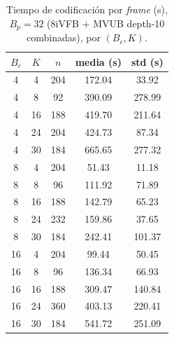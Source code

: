         \begin{table}[H]
            \centering
            \caption{Tiempo de codificación por \textit{frame} (s), $B_p=32$ (8iVFB + MVUB
            depth-10 combinadas), por $(B_c, K)$.}
            \begin{tabular}{c|c|c|c|c}
                \hline
                $B_c$ & $K$ & $n$ & \textbf{media (s)} & \textbf{std (s)} \\
                \hline
                4  &  4 & 204 &  172.04 &  33.92 \\
                4  &  8 &  92 &  390.09 & 278.99 \\
                4  & 16 & 188 &  419.70 & 211.64 \\
                4  & 24 & 204 &  424.73 &  87.34 \\
                4  & 30 & 184 &  665.65 & 277.32 \\
                \hline
                8  &  4 & 204 &   51.43 &  11.18 \\
                8  &  8 &  96 &  111.92 &  71.89 \\
                8  & 16 & 188 &  142.79 &  65.23 \\
                8  & 24 & 232 &  159.86 &  37.65 \\
                8  & 30 & 184 &  242.41 & 101.37 \\
                \hline
                16 &  4 & 204 &   99.44 &  50.45 \\
                16 &  8 &  96 &  136.34 &  66.93 \\
                16 & 16 & 188 &  309.47 & 140.84 \\
                16 & 24 & 360 &  403.13 & 220.41 \\
                16 & 30 & 184 &  541.72 & 251.09 \\
                \hline
            \end{tabular}
            \label{tab:e10_cost_bp32}
        \end{table}

